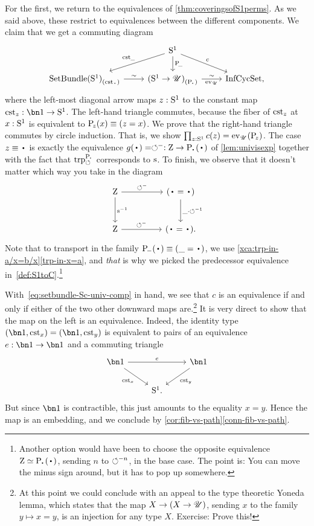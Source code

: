 For the first, we return to the equivalences of \cref{thm:coveringsofS1perms}.
As we said above, these restrict to equivalences between the different components.
We claim that we get a commuting diagram
\begin{equation}\label{eq:setbundle-Sc-univ-comp}
  \begin{tikzcd}
    & \Sc\ar[dl,"\cst{\blank}"']\ar[d,"\uc{\blank}"]\ar[dr,"c"] & \\
    \conncomp{\SetBundle(\Sc)}{\cst\base} \ar[r,"\sim"]
    & \conncomp{(\Sc\to\UU)}{\uc\base} \ar[r,"\sim","\ev_\UU"']
    & \InfCycSet,
  \end{tikzcd}
\end{equation}
where the left-most diagonal arrow maps $z:{\mathrm{S}^1}$ to the constant map $\cst z:\bn 1\to\Sc$.
The left-hand triangle commutes, because the fiber of $\cst z$ at $x:{\mathrm{S}^1}$
is equivalent to $\uc{z}(x) \jdeq (z=x)$.
We prove that the right-hand triangle commutes by circle induction.
That is, we show $\prod_{z:\Sc}c(z) = \ev_\UU(\uc{z})$.
The case $z\jdeq\base$ is exactly the equivalence
$g(\base) = \Sloop^- : \zet \to \uc{\base}(\base)$ of \cref{lem:univisexp}
together with the fact that $\trp[\uc\base]{\Sloop}$ corresponds to $\zs$.
To finish, we observe that it doesn't matter which way you take in the diagram
\[
  \begin{tikzcd}[row sep=large,column sep=huge]
    \zet\ar[r,"\Sloop^-"]\ar[d,"\inv{\zs}"] &
    (\base=\base)\ar[d,"\blank\cdot\Sloop^{-1}"] \\
    \zet\ar[r,"\Sloop^-"] & (\base=\base).
  \end{tikzcd}
\]
Note that to transport in the family $\uc{-}(\base) \jdeq (\blank = \base)$,
we use \cref{xca:trp-in-a/x=b/x}\ref{trp-in-x=a},
and \emph{that} is why we picked the predecessor equivalence in~\cref{def:S1toC}.\footnote{%
  Another option would have been to choose the opposite equivalence $\zet\equiv\uc\base(\base)$, sending $n$ to $\circlearrowleft^{-n}$, in the base case.
  The point is: You can move the minus sign around, but it has to pop up somewhere.}

With~\eqref{eq:setbundle-Sc-univ-comp} in hand, we see that $c$ is an equivalence
if and only if either of the two other downward maps are.\footnote{%
  At this point we could conclude with an appeal to the type theoretic Yoneda lemma,
  which states that the map $X \to (X \to {\mathscr{U}})$,
  sending $x$ to the family $y \mapsto x=y$,
  is an injection for any type $X$.
  Exercise: Prove this!}
It is very direct to show that the map on the left is an equivalence.
Indeed, the identity type $(\bn 1,\cst x)=(\bn 1,\cst y)$
is equivalent to pairs of an equivalence $e : \bn 1 \to \bn 1$ and a commuting triangle
\[
  \begin{tikzcd}
    \bn 1 \ar[rr,"e"]\ar[dr,"\cst x"'] & & \bn 1\ar[dl,"\cst y"] \\
    & \Sc. &
  \end{tikzcd}
\]
But since $\bn 1$ is contractible, this just amounts to the equality $x=y$.
Hence the map is an embedding, and we conclude by \cref{cor:fib-vs-path}\ref{conn-fib-vs-path}.

